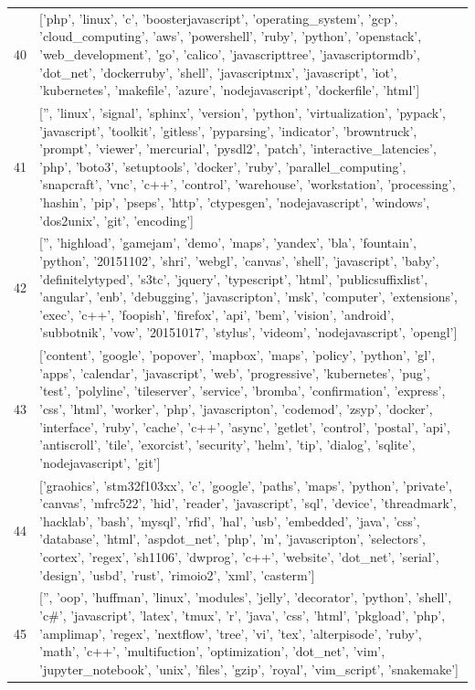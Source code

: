 \begin{center}
\begin{longtable}{|p{1.5cm}|p{12.5cm}|}
            40 & ['php', 'linux', 'c', 'boosterjavascript', 'operating\_system', 'gcp', 'cloud\_computing', 'aws', 'powershell', 'ruby', 'python', 'openstack', 'web\_development', 'go', 'calico', 'javascripttree', 'javascriptormdb', 'dot\_net', 'dockerruby', 'shell', 'javascriptmx', 'javascript', 'iot', 'kubernetes', 'makefile', 'azure', 'nodejavascript', 'dockerfile', 'html']  \\ 
            41 & ['', 'linux', 'signal', 'sphinx', 'version', 'python', 'virtualization', 'pypack', 'javascript', 'toolkit', 'gitless', 'pyparsing', 'indicator', 'browntruck', 'prompt', 'viewer', 'mercurial', 'pysdl2', 'patch', 'interactive\_latencies', 'php', 'boto3', 'setuptools', 'docker', 'ruby', 'parallel\_computing', 'snapcraft', 'vnc', 'c++', 'control', 'warehouse', 'workstation', 'processing', 'hashin', 'pip', 'pseps', 'http', 'ctypesgen', 'nodejavascript', 'windows', 'dos2unix', 'git', 'encoding']  \\ 
            42 & ['', 'highload', 'gamejam', 'demo', 'maps', 'yandex', 'bla', 'fountain', 'python', '20151102', 'shri', 'webgl', 'canvas', 'shell', 'javascript', 'baby', 'definitelytyped', 's3tc', 'jquery', 'typescript', 'html', 'publicsuffixlist', 'angular', 'enb', 'debugging', 'javascripton', 'msk', 'computer', 'extensions', 'exec', 'c++', 'foopish', 'firefox', 'api', 'bem', 'vision', 'android', 'subbotnik', 'vow', '20151017', 'stylus', 'videom', 'nodejavascript', 'opengl']  \\ 
            43 & ['content', 'google', 'popover', 'mapbox', 'maps', 'policy', 'python', 'gl', 'apps', 'calendar', 'javascript', 'web', 'progressive', 'kubernetes', 'pug', 'test', 'polyline', 'tileserver', 'service', 'bromba', 'confirmation', 'express', 'css', 'html', 'worker', 'php', 'javascripton', 'codemod', 'zsyp', 'docker', 'interface', 'ruby', 'cache', 'c++', 'async', 'getlet', 'control', 'postal', 'api', 'antiscroll', 'tile', 'exorcist', 'security', 'helm', 'tip', 'dialog', 'sqlite', 'nodejavascript', 'git']  \\ 
            44 & ['graohics', 'stm32f103xx', 'c', 'google', 'paths', 'maps', 'python', 'private', 'canvas', 'mfrc522', 'hid', 'reader', 'javascript', 'sql', 'device', 'threadmark', 'hacklab', 'bash', 'mysql', 'rfid', 'hal', 'usb', 'embedded', 'java', 'css', 'database', 'html', 'aspdot\_net', 'php', 'm', 'javascripton', 'selectors', 'cortex', 'regex', 'sh1106', 'dwprog', 'c++', 'website', 'dot\_net', 'serial', 'design', 'usbd', 'rust', 'rimoio2', 'xml', 'casterm']  \\ 
            45 & ['', 'oop', 'huffman', 'linux', 'modules', 'jelly', 'decorator', 'python', 'shell', 'c\#', 'javascript', 'latex', 'tmux', 'r', 'java', 'css', 'html', 'pkgload', 'php', 'amplimap', 'regex', 'nextflow', 'tree', 'vi', 'tex', 'alterpisode', 'ruby', 'math', 'c++', 'multifuction', 'optimization', 'dot\_net', 'vim', 'jupyter\_notebook', 'unix', 'files', 'gzip', 'royal', 'vim\_script', 'snakemake']  \\ 

\end{longtable}
\end{center}
